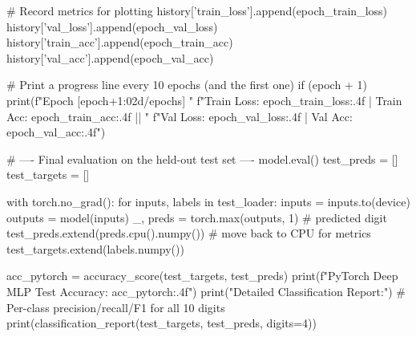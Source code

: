 \begin{codebox}[title={Training configuration}]
    # Record metrics for plotting
    history['train_loss'].append(epoch_train_loss)
    history['val_loss'].append(epoch_val_loss)
    history['train_acc'].append(epoch_train_acc)
    history['val_acc'].append(epoch_val_acc)

    # Print a progress line every 10 epochs (and the first one)
    if (epoch + 1) %
        print(f"Epoch [{epoch+1:02d}/{epochs}] "
              f"Train Loss: {epoch_train_loss:.4f} | Train Acc: {epoch_train_acc:.4f} || "
              f"Val Loss: {epoch_val_loss:.4f} | Val Acc: {epoch_val_acc:.4f}")
\end{codebox}

\begin{codebox}[title={Final evaluation on the held-out test set}]
# ---- Final evaluation on the held-out test set ----
model.eval()
test_preds = []
test_targets = []

with torch.no_grad():
    for inputs, labels in test_loader:
        inputs = inputs.to(device)
        outputs = model(inputs)
        _, preds = torch.max(outputs, 1)          # predicted digit
        test_preds.extend(preds.cpu().numpy())    # move back to CPU for metrics
        test_targets.extend(labels.numpy())

acc_pytorch = accuracy_score(test_targets, test_preds)
print(f"PyTorch Deep MLP Test Accuracy: {acc_pytorch:.4f}\n")
print("Detailed Classification Report:")
# Per-class precision/recall/F1 for all 10 digits
print(classification_report(test_targets, test_preds, digits=4))
\end{codebox}
